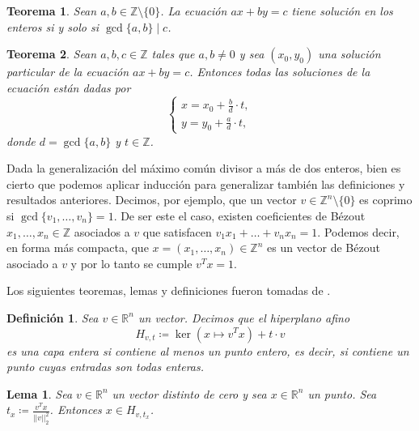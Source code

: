 \documentclass[11pt]{article}
\newtheorem{definition}{Definición}
\newtheorem{theorem}{Teorema}
\newtheorem{lemma}{Lema}
\begin{document}
\begin{theorem}
	\label{th:dioph:existence}
	Sean $a, b \in \mathbb{Z} \setminus\lbrace 0 \rbrace$. La ecuación $ax + by = c$ tiene solución
	en los enteros si y solo si $\gcd\lbrace a, b \rbrace \mid c$.
\end{theorem}

\begin{theorem}
	\label{th:dioph:gen}
	Sean $a, b, c \in \mathbb{Z}$ tales que $a, b \neq 0$ y sea $(x_0, y_0)$ una solución particular
	de la ecuación $ax + by = c$. Entonces todas las soluciones de la ecuación están dadas por
	\begin{equation*}
		\begin{cases}
			x = x_0 + \frac{b}{d} \cdot t, \\
			y = y_0 + \frac{a}{d} \cdot t,
		\end{cases}
	\end{equation*}
	donde $d = \gcd\lbrace a, b \rbrace$ y $t \in \mathbb{Z}$.
\end{theorem}

Dada la generalización del máximo común divisor a más de dos enteros, bien es cierto que podemos
aplicar inducción para generalizar también las definiciones y resultados anteriores. Decimos, por
ejemplo, que un vector $v \in \mathbb{Z}^n \setminus \lbrace 0 \rbrace$ es coprimo si $\gcd\lbrace
v_1, \ldots, v_n \rbrace = 1$. De ser este el caso, existen coeficientes de Bézout $x_1, \ldots,
x_n \in \mathbb{Z}$ asociados a $v$ que satisfacen $v_1x_1 + \ldots + v_nx_n = 1$. Podemos decir, en
forma más compacta, que $x = (x_1, \ldots, x_n) \in \mathbb{Z}^n$ es un vector de Bézout asociado a
$v$ y por lo tanto se cumple $v^Tx = 1$.

Los siguientes teoremas, lemas y definiciones fueron tomadas de \cite{sip}.

\begin{definition}
	Sea $v \in \mathbb{R}^n$ un vector. Decimos que el hiperplano afino
	\begin{equation*}
		H_{v, t} \coloneq \ker(x \mapsto v^Tx) + t \cdot v
	\end{equation*}
	es una capa entera si contiene al menos un punto entero, es decir, si contiene un punto cuyas
	entradas son todas enteras.
\end{definition}

\begin{lemma}
	Sea $v \in \mathbb{R}^n$ un vector distinto de cero y sea $x \in \mathbb{R}^n$ un punto. Sea $t_x
	\coloneq \frac{v^Tx}{||v||_2^2}$. Entonces $x \in H_{v, t_x}$.
\end{lemma}
\end{document}
